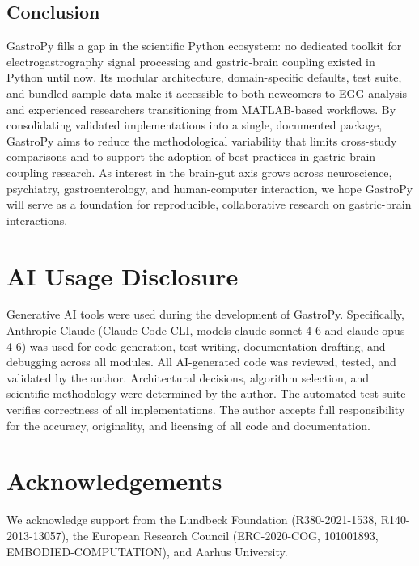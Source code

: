 \documentclass[12pt]{article}
\begin{document}
\subsection{Conclusion}

GastroPy fills a gap in the scientific Python ecosystem: no dedicated toolkit
for electrogastrography signal processing and gastric-brain coupling existed
in Python until now. Its modular architecture, domain-specific defaults, test
suite, and bundled sample data make it accessible to both newcomers to EGG
analysis and experienced researchers transitioning from MATLAB-based
workflows. By consolidating validated implementations into a single,
documented package, GastroPy aims to reduce the methodological variability
that limits cross-study comparisons and to support the adoption of best
practices in gastric-brain coupling research. As interest in the brain-gut
axis grows across neuroscience, psychiatry, gastroenterology, and
human-computer interaction, we hope GastroPy will serve as a foundation for
reproducible, collaborative research on gastric-brain interactions.

\section*{AI Usage Disclosure}

Generative AI tools were used during the development of GastroPy.
Specifically, Anthropic Claude (Claude Code CLI, models
claude-sonnet-4-6 and claude-opus-4-6) was used for code
generation, test writing, documentation drafting, and debugging across all
modules. All AI-generated code was reviewed, tested, and validated by the
author. Architectural decisions, algorithm selection, and scientific
methodology were determined by the author. The automated test suite verifies
correctness of all implementations. The author accepts full responsibility for
the accuracy, originality, and licensing of all code and documentation.

\section*{Acknowledgements}

We acknowledge support from the Lundbeck Foundation (R380-2021-1538,
R140-2013-13057), the European Research Council (ERC-2020-COG, 101001893,
EMBODIED-COMPUTATION), and Aarhus University.



\end{document}
